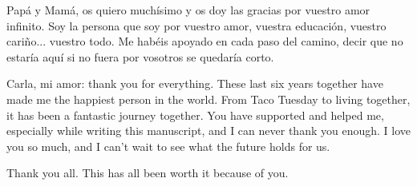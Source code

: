 Papá y Mamá, os quiero muchísimo y os doy las gracias por vuestro amor infinito. Soy la persona que soy por vuestro amor, vuestra educación, vuestro cariño... vuestro todo. Me habéis apoyado en cada paso del camino, decir que no estaría aquí si no fuera por vosotros se quedaría corto.

Carla, mi amor: thank you for everything. These last six years together have made me the happiest person in the world. From Taco Tuesday to living together, it has been a fantastic journey together. You have supported and helped me, especially while writing this manuscript, and I can never thank you enough. I love you so much, and I can't wait to see what the future holds for us.

Thank you all. This has all been worth it because of you.
